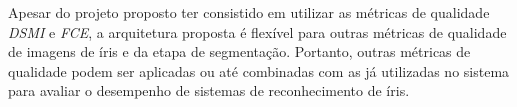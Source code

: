 \par Apesar do projeto proposto ter consistido em utilizar as métricas de qualidade \textit{\acrshort{DSMI}} e \textit{\acrshort{FCE}}, a arquitetura proposta é flexível para outras métricas de qualidade de imagens de íris e da etapa de segmentação. Portanto, outras métricas de qualidade podem ser aplicadas ou até combinadas com as já utilizadas no sistema para avaliar o desempenho de sistemas de reconhecimento de íris.